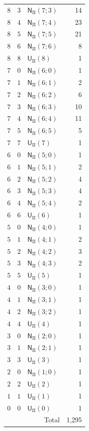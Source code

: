 \documentclass[10pt]{article}
\begin{document}
\begin{longtable}{@{}r r >{\RaggedRight\arraybackslash}p{0.48\linewidth} r@{}}
$8$ & $3$ & $\mathsf N_{\mathrm{II}}(7;3)$ & 14 \\
$8$ & $4$ & $\mathsf N_{\mathrm{II}}(7;4)$ & 23 \\
$8$ & $5$ & $\mathsf N_{\mathrm{II}}(7;5)$ & 21 \\
$8$ & $6$ & $\mathsf N_{\mathrm{II}}(7;6)$ & 8 \\
$8$ & $8$ & $\mathsf U_{\mathrm{II}}(8)$ & 1 \\
$7$ & $0$ & $\mathsf N_{\mathrm{II}}(6;0)$ & 1 \\
$7$ & $1$ & $\mathsf N_{\mathrm{II}}(6;1)$ & 2 \\
$7$ & $2$ & $\mathsf N_{\mathrm{II}}(6;2)$ & 6 \\
$7$ & $3$ & $\mathsf N_{\mathrm{II}}(6;3)$ & 10 \\
$7$ & $4$ & $\mathsf N_{\mathrm{II}}(6;4)$ & 11 \\
$7$ & $5$ & $\mathsf N_{\mathrm{II}}(6;5)$ & 5 \\
$7$ & $7$ & $\mathsf U_{\mathrm{II}}(7)$ & 1 \\
$6$ & $0$ & $\mathsf N_{\mathrm{II}}(5;0)$ & 1 \\
$6$ & $1$ & $\mathsf N_{\mathrm{II}}(5;1)$ & 2 \\
$6$ & $2$ & $\mathsf N_{\mathrm{II}}(5;2)$ & 4 \\
$6$ & $3$ & $\mathsf N_{\mathrm{II}}(5;3)$ & 4 \\
$6$ & $4$ & $\mathsf N_{\mathrm{II}}(5;4)$ & 2 \\
$6$ & $6$ & $\mathsf U_{\mathrm{II}}(6)$ & 1 \\
$5$ & $0$ & $\mathsf N_{\mathrm{II}}(4;0)$ & 1 \\
$5$ & $1$ & $\mathsf N_{\mathrm{II}}(4;1)$ & 2 \\
$5$ & $2$ & $\mathsf N_{\mathrm{II}}(4;2)$ & 3 \\
$5$ & $3$ & $\mathsf N_{\mathrm{II}}(4;3)$ & 2 \\
$5$ & $5$ & $\mathsf U_{\mathrm{II}}(5)$ & 1 \\
$4$ & $0$ & $\mathsf N_{\mathrm{II}}(3;0)$ & 1 \\
$4$ & $1$ & $\mathsf N_{\mathrm{II}}(3;1)$ & 1 \\
$4$ & $2$ & $\mathsf N_{\mathrm{II}}(3;2)$ & 1 \\
$4$ & $4$ & $\mathsf U_{\mathrm{II}}(4)$ & 1 \\
$3$ & $0$ & $\mathsf N_{\mathrm{II}}(2;0)$ & 1 \\
$3$ & $1$ & $\mathsf N_{\mathrm{II}}(2;1)$ & 1 \\
$3$ & $3$ & $\mathsf U_{\mathrm{II}}(3)$ & 1 \\
$2$ & $0$ & $\mathsf N_{\mathrm{II}}(1;0)$ & 1 \\
$2$ & $2$ & $\mathsf U_{\mathrm{II}}(2)$ & 1 \\
$1$ & $1$ & $\mathsf U_{\mathrm{II}}(1)$ & 1 \\
$0$ & $0$ & $\mathsf U_{\mathrm{II}}(0)$ & 1 \\
\midrule
\multicolumn{3}{r}{Total} & 1,295 \\
\end{longtable}
\end{document}
